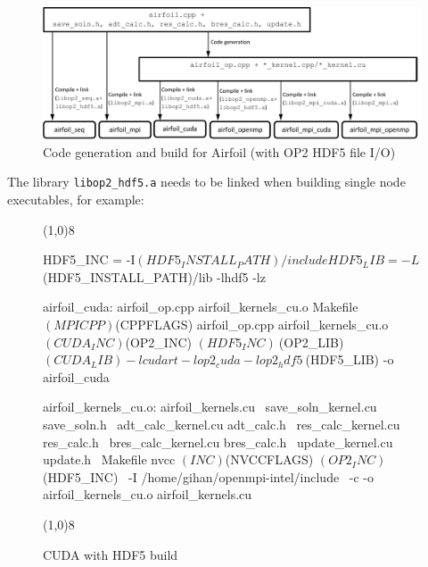 \documentclass[11pt]{article}
\begin{document}
\begin{figure}[ht]\centering\vspace{0pt}
\includegraphics[width=15.5cm]{airfoil_hdf5}\vspace{-0pt}
\caption{Code generation and build for Airfoil (with OP2 HDF5 file I/O)}\label{fig/build-paths-hdf5}\vspace{-5pt}
\end{figure}

\newpage
\noindent The library \texttt{libop2\_hdf5.a} needs to be linked when building single node executables, for example:

\begin{figure}[!h]\small
\vspace{-0pt}\noindent\line(1,0){8}\vspace{-20pt}
\begin{pyglist}[language=make]
HDF5_INC = -I$(HDF5_INSTALL_PATH)/include
HDF5_LIB = -L$(HDF5_INSTALL_PATH)/lib -lhdf5 -lz

airfoil_cuda:   airfoil_op.cpp airfoil_kernels_cu.o Makefile
                $(MPICPP) $(CPPFLAGS) airfoil_op.cpp airfoil_kernels_cu.o \
                $(CUDA_INC) $(OP2_INC) $(HDF5_INC) \
                $(OP2_LIB) $(CUDA_LIB) -lcudart -lop2_cuda -lop2_hdf5 \
                $(HDF5_LIB) -o airfoil_cuda

airfoil_kernels_cu.o:   airfoil_kernels.cu      \
                save_soln_kernel.cu save_soln.h \
                adt_calc_kernel.cu  adt_calc.h  \
                res_calc_kernel.cu  res_calc.h  \
                bres_calc_kernel.cu bres_calc.h \
                update_kernel.cu    update.h    \
                Makefile
                nvcc $(INC) $(NVCCFLAGS) $(OP2_INC) $(HDF5_INC) \
                -I /home/gihan/openmpi-intel/include \
                -c -o airfoil_kernels_cu.o airfoil_kernels.cu
\end{pyglist}
\vspace{-10pt}\noindent\line(1,0){8}\vspace{-10pt}
\caption{\small CUDA with HDF5 build }
\normalsize\vspace{-10pt}\label{fig:hdf5build}
\end{figure}
\end{document}
